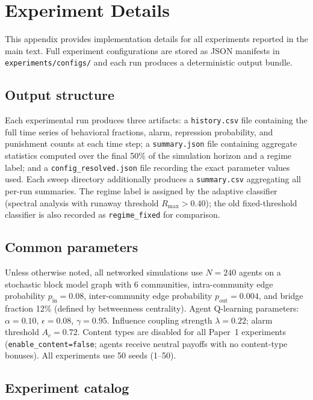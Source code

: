 \section{Experiment Details}
\label{app:experiments}

This appendix provides implementation details for all experiments reported in the main text. Full experiment configurations are stored as JSON manifests in \texttt{experiments/configs/} and each run produces a deterministic output bundle.

\subsection{Output structure}

Each experimental run produces three artifacts: a \texttt{history.csv} file containing the full time series of behavioral fractions, alarm, repression probability, and punishment counts at each time step; a \texttt{summary.json} file containing aggregate statistics computed over the final 50\% of the simulation horizon and a regime label; and a \texttt{config\_resolved.json} file recording the exact parameter values used. Each sweep directory additionally produces a \texttt{summary.csv} aggregating all per-run summaries. The regime label is assigned by the adaptive classifier (spectral analysis with runaway threshold $R_{\max}>0.40$); the old fixed-threshold classifier is also recorded as \texttt{regime\_fixed} for comparison.

\subsection{Common parameters}

Unless otherwise noted, all networked simulations use $N=240$ agents on a stochastic block model graph with 6 communities, intra-community edge probability $p_{\mathrm{in}}=0.08$, inter-community edge probability $p_{\mathrm{out}}=0.004$, and bridge fraction 12\% (defined by betweenness centrality). Agent Q-learning parameters: $\alpha=0.10$, $\epsilon=0.08$, $\gamma=0.95$. Influence coupling strength $\lambda=0.22$; alarm threshold $A_c=0.72$. Content types are disabled for all Paper~1 experiments (\texttt{enable\_content=false}; agents receive neutral payoffs with no content-type bonuses). All experiments use 50 seeds (1--50).

\subsection{Experiment catalog}

